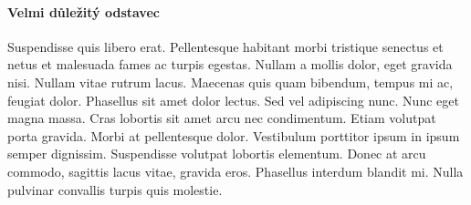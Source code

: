 \documentclass[10pt,a4paper]{article}
\begin{document}
	\paragraph{Velmi důležitý odstavec}
	Suspendisse quis libero erat. Pellentesque habitant morbi tristique senectus et netus et malesuada fames ac turpis egestas. Nullam a mollis dolor, eget gravida nisi. Nullam vitae rutrum lacus. Maecenas quis quam bibendum, tempus mi ac, feugiat dolor. Phasellus sit amet dolor lectus. Sed vel adipiscing nunc. Nunc eget magna massa. Cras lobortis sit amet arcu nec condimentum. Etiam volutpat porta gravida. Morbi at pellentesque dolor. Vestibulum porttitor ipsum in ipsum semper dignissim. Suspendisse volutpat lobortis elementum. Donec at arcu commodo, sagittis lacus vitae, gravida eros. Phasellus interdum blandit mi. Nulla pulvinar convallis turpis quis molestie.\\
\end{document}
